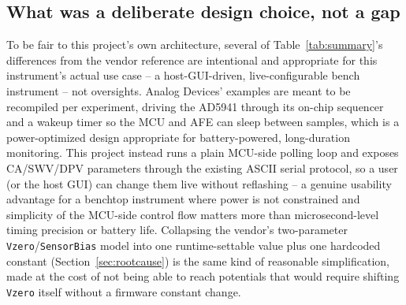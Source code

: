 \subsection{What was a deliberate design choice, not a gap}
\label{sec:deliberate}
To be fair to this project's own architecture, several of
Table~\ref{tab:summary}'s differences from the vendor reference are
intentional and appropriate for this instrument's actual use case -- a
host-GUI-driven, live-configurable bench instrument -- not oversights.
Analog Devices' examples are meant to be recompiled per experiment,
driving the AD5941 through its on-chip sequencer and a wakeup timer so the
MCU and AFE can sleep between samples, which is a power-optimized design
appropriate for battery-powered, long-duration monitoring. This project
instead runs a plain MCU-side polling loop and exposes CA/SWV/DPV
parameters through the existing ASCII serial protocol, so a user (or the
host GUI) can change them live without reflashing -- a genuine usability
advantage for a benchtop instrument where power is not constrained and
simplicity of the MCU-side control flow matters more than microsecond-level
timing precision or battery life. Collapsing the vendor's two-parameter
\texttt{Vzero}/\texttt{SensorBias} model into one runtime-settable value
plus one hardcoded constant (Section~\ref{sec:rootcause}) is the same kind
of reasonable simplification, made at the cost of not being able to reach
potentials that would require shifting \texttt{Vzero} itself without a
firmware constant change.

